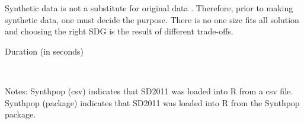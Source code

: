 \documentclass[runningheads]{llncs}
\begin{document}
Synthetic data is not a substitute for original data \cite{jordon2022synthetic}.  Therefore, prior to making synthetic data, one must decide the purpose.  There is no one size fits all solution and choosing the right SDG is the result of different trade-offs.  





\begin{table}
    \centering
    \caption{Duration (in seconds)}
    \resizebox{\textwidth}{!}{}
    \label{table:table_sd2011_duration}
    \\
    \raggedright
    \tiny{Notes: Synthpop (csv) indicates that SD2011 was loaded into R from a csv file.  Synthpop (package) indicates that SD2011 was loaded into R from the Synthpop package.}
\end{table}

\end{document}
